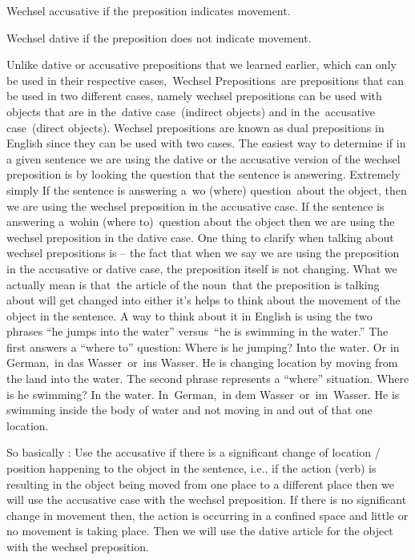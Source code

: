 \documentclass[a4paper,twocolumn,10pt]{article}
\begin{document}
Wechsel accusative if the preposition indicates movement.

Wechsel dative if the preposition does not indicate movement.


Unlike dative or accusative prepositions that we learned earlier, which can only
be used in their respective cases, Wechsel Prepositions are prepositions that
can be used in two different cases, namely wechsel prepositions can be used with
objects that are in the dative case (indirect objects) and in the accusative
case (direct objects). Wechsel prepositions are known as dual prepositions in
English since they can be used with two cases.
The easiest way to determine if in a given sentence we are using the dative or
the accusative version of the wechsel preposition is by looking the question
that the sentence is answering. Extremely simply If the sentence is answering
a wo (where) question about the object, then we are using the wechsel
preposition in the accusative case. If the sentence is answering a wohin (where
to) question about the object then we are using the wechsel preposition in the
dative case.
One thing to clarify when talking about wechsel prepositions is – the fact that
when we say we are using the preposition in the accusative or dative case, the
preposition itself is not changing. What we actually mean is that the article of
the noun that the preposition is talking about will get changed into either it’s
helps to think about the movement of the object in the sentence. A way to think
about it in English is using the two phrases “he jumps into the water”
versus “he is swimming in the water.” The first answers a “where to” question:
Where is he jumping? Into the water. Or in German, in das Wasser or ins Wasser.
He is changing location by moving from the land into the water. The second
phrase represents a “where” situation. Where is he swimming? In the water.
In German, in dem Wasser or im Wasser. He is swimming inside the body of water
and not moving in and out of that one location.


So basically :
Use the accusative if there is a significant change of location / position
happening to the object in the sentence, i.e., if the action (verb) is resulting
in the object being moved from one place to a different place then we will use
the accusative case with the wechsel preposition.
If there is no significant change in movement then, the action is occurring in a
confined space and little or no movement is taking place. Then we will use the
dative article for the object with the wechsel preposition.
\end{document}
